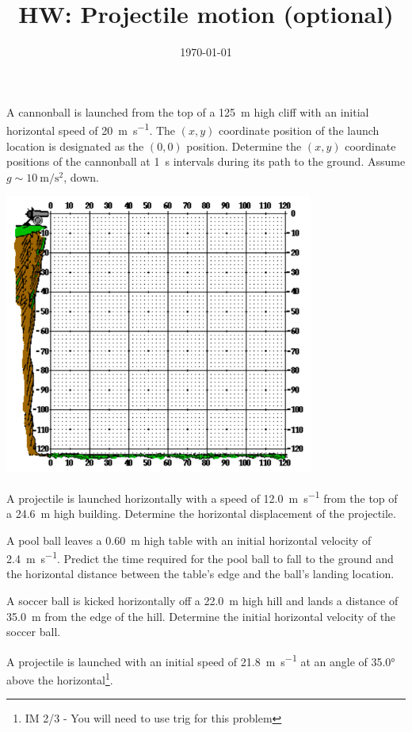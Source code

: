 \documentclass [hw,addpoints,noanswers]{exam}
\title{HW: Projectile motion (optional)}
\author{\mobeardInstructorShort}
\date{\today}
\begin{document}
\maketitle

\begin{questions}
\question  A cannonball is launched from the top of a \SI{125}{\meter} high cliff with an initial horizontal speed of \SI{20}{\meter\per\second}. The $(x, y)$ coordinate position of the launch location is designated as the $(0, 0)$ position. Determine the $(x, y)$ coordinate positions of the cannonball at \SI{1}{\second} intervals during its path to the ground. Assume $g \sim \SI{10}{\meter\per\second\squared}$, down.
\begin{center}
\includegraphics[width=4in]{hw-projectile-q1.png}
\end{center}
\question A projectile is launched horizontally with a speed of \SI{12.0}{\meter\per\second} from the top of a \SI{24.6}{\meter} high building. Determine the horizontal displacement of the projectile.

\question A pool ball leaves a \SI{0.60}{\meter} high table with an initial horizontal velocity of \SI{2.4}{\meter\per\second}. Predict the time required for the pool ball to fall to the ground and the horizontal distance between the table's edge and the ball's landing location.

\question A soccer ball is kicked horizontally off a \SI{22.0}{\meter} high hill and lands a distance of \SI{35.0}{\meter} from the edge of the hill. Determine the initial horizontal velocity of the soccer ball.



\question  A projectile is launched with an initial speed of \SI{21.8}{\meter\per\second} at an angle of \ang{35.0} above the horizontal\footnote{IM 2/3 - You will need to use trig for this problem}.
\begin{parts}

\end{parts}
\end{questions}
\end{document}
